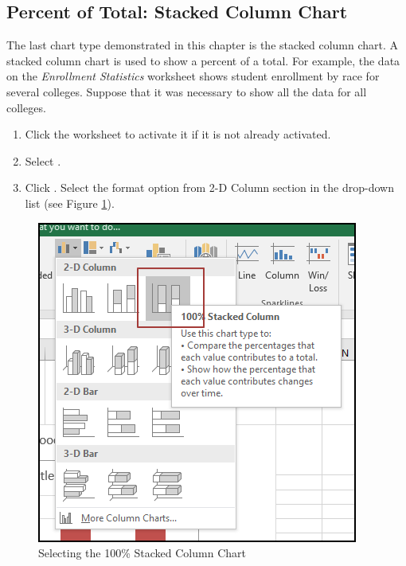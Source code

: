 \subsection{Percent of Total: Stacked Column Chart}

The last chart type demonstrated in this chapter is the stacked column chart. A stacked column chart is used  to show a percent of a total. For example, the data on the \textit{Enrollment Statistics} worksheet shows student enrollment by race for several colleges. Suppose that it was necessary to show all the data for all colleges.

\begin{enumbox}
	\begin{enumerate}
		\item Click the  worksheet to activate it if it is not already activated.
		\item Select .
		\item Click .	Select the  format option from 2-D Column section in the drop-down list (see Figure \ref{04:fig24}).
	\end{enumerate}
\end{enumbox}
	
\begin{figure}[H]
	\centering
	\includegraphics[width=\maxwidth{.65\linewidth}]{gfx/ch04_fig24}
	\caption{Selecting the 100\% Stacked Column Chart}
	\label{04:fig24}
\end{figure}

